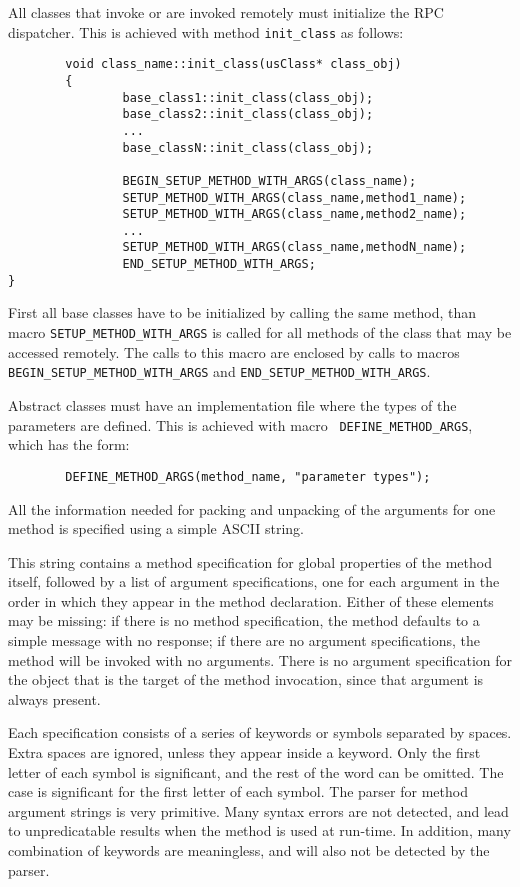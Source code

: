 All classes that invoke or are invoked remotely must initialize the
RPC dispatcher. This is achieved with method {\tt init\_class} as
follows: 

\begin{verbatim}
        void class_name::init_class(usClass* class_obj)
        {
                base_class1::init_class(class_obj);
                base_class2::init_class(class_obj);
                ...
                base_classN::init_class(class_obj);

                BEGIN_SETUP_METHOD_WITH_ARGS(class_name);
                SETUP_METHOD_WITH_ARGS(class_name,method1_name);
                SETUP_METHOD_WITH_ARGS(class_name,method2_name);
                ...
                SETUP_METHOD_WITH_ARGS(class_name,methodN_name);
                END_SETUP_METHOD_WITH_ARGS;
}
\end{verbatim}

First all base classes have to be initialized by calling the same
method, than macro {\tt SETUP\_METHOD\_WITH\_ARGS} is called for all
methods of the class that may be accessed remotely. The calls to this
macro are enclosed by calls to macros {\tt
BEGIN\_SETUP\_METHOD\_WITH\_ARGS} and {\tt END\_SETUP\_METHOD\_WITH\_ARGS}.

Abstract classes must have an implementation file where the types of
the parameters are defined. This is achieved with macro {\tt
DEFINE\_METHOD\_ARGS}, which has the form:

\begin{verbatim}
        DEFINE_METHOD_ARGS(method_name, "parameter types");
\end{verbatim}


All the information needed for packing and unpacking of the arguments
for one method is specified using a simple ASCII string.

This string contains a method specification for global properties of
the method itself, followed by a list of argument specifications, one
for each argument in the order in which they appear in the method
declaration.  Either of these elements may be missing: if there is no
method specification, the method defaults to a simple message with no
response; if there are no argument specifications, the method will be
invoked with no arguments. There is no argument specification for the
object that is the target of the method invocation, since that
argument is always present.

Each specification consists of a series of keywords or symbols
separated by spaces. Extra spaces are ignored, unless they appear
inside a keyword. Only the first letter of each symbol is significant,
and the rest of the word can be omitted. The case is significant for
the first letter of each symbol. The parser for method argument
strings is very primitive. Many syntax errors are not detected, and
lead to unpredicatable results when the method is used at run-time. In
addition, many combination of keywords are meaningless, and will also
not be detected by the parser.

